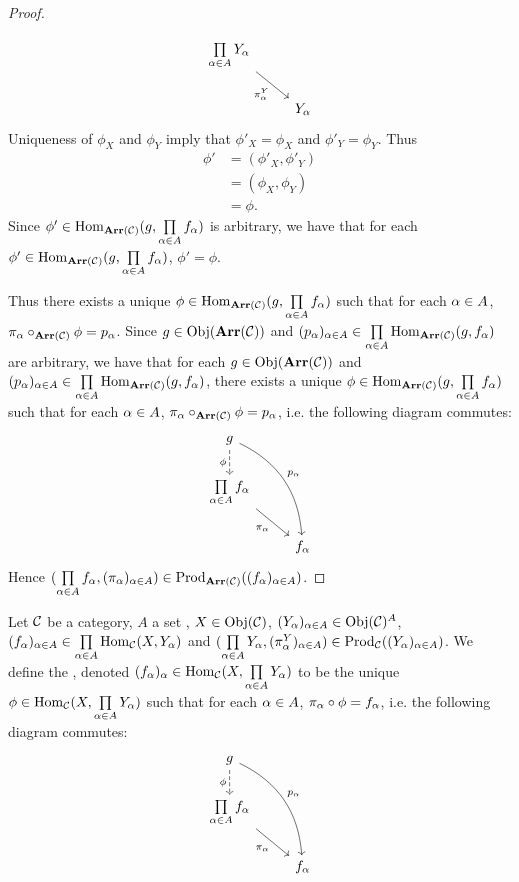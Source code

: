\documentclass{book}
\begin{document}
\begin{proof}
\begin{itemize}
\[\begin{tikzcd}[baseline= 7]
				\prod\limits_{\al \in A} Y_{\al} \arrow[dr, "\pi^Y_{\al}"']                        & \\
				& Y_{\al}   
			\end{tikzcd}
			\]
			Uniqueness of $\phi_X$ and $\phi_Y$ imply that $\phi'_X = \phi_X$ and $\phi'_Y = \phi_Y$. Thus 
			\begin{align*}
				\phi'
				& = (\phi'_X, \phi'_Y) \\
				& = (\phi_X, \phi_Y) \\
				& = \phi.
			\end{align*}
			Since $\phi' \in \operatorname{Hom}_{\operatorname{\textbf{Arr}}(\mathcal{C})}(g, \prod\limits_{\alpha \in A} f_{\alpha})$ is arbitrary, we have that for each $\phi' \in \operatorname{Hom}_{\operatorname{\textbf{Arr}}(\mathcal{C})}(g, \prod\limits_{\alpha \in A} f_{\alpha})$, $\phi' = \phi$. 
		\end{itemize}
		Thus there exists a unique $\phi \in \operatorname{Hom}_{\operatorname{\textbf{Arr}}(\mathcal{C})}(g, \prod\limits_{\alpha \in A} f_{\alpha})$ such that for each $\alpha \in A$, $\pi_{\alpha} \circ_{\operatorname{\textbf{Arr}}(\mathcal{C})} \phi = p_{\alpha}$. Since $g \in \operatorname{Obj}(\operatorname{\textbf{Arr}}(\mathcal{C}))$ and $(p_{\alpha})_{\alpha \in A} \in \prod\limits_{\alpha \in A} \operatorname{Hom}_{\operatorname{\textbf{Arr}}(\mathcal{C})}(g, f_{\alpha})$ are arbitrary, we have that for each $g \in \operatorname{Obj}(\operatorname{\textbf{Arr}}(\mathcal{C}))$ and $(p_{\alpha})_{\alpha \in A} \in \prod\limits_{\alpha \in A} \operatorname{Hom}_{\operatorname{\textbf{Arr}}(\mathcal{C})}(g, f_{\alpha})$, there exists a unique $\phi \in \operatorname{Hom}_{\operatorname{\textbf{Arr}}(\mathcal{C})}(g, \prod\limits_{\alpha \in A} f_{\alpha})$ such that for each $\alpha \in A$, $\pi_{\alpha} \circ_{\operatorname{\textbf{Arr}}(\mathcal{C})} \phi = p_{\alpha}$,
		i.e. the following diagram commutes:
		\[
		\begin{tikzcd}[baseline= 7]
			g   \arrow[d, "\phi"', dashed]  \arrow[ddr, "p_{\al}"', bend left=30, swap]    &  \\
			\prod\limits_{\al \in A} f_{\al} \arrow[dr, "\pi_{\al}"']                        & \\
			& f_{\al}
		\end{tikzcd}
		\]
		Hence $(\prod\limits_{\alpha \in A} f_{\alpha}, (\pi_{\alpha})_{\alpha \in A}) \in \operatorname{Prod}_{\operatorname{\textbf{Arr}}(\mathcal{C})}((f_{\alpha})_{\alpha \in A})$.
	\end{proof}
	
	\begin{defn}
		Let $\mathcal{C}$ be a category, $A$ a set , $X \in \operatorname{Obj}(\mathcal{C})$, $(Y_{\alpha})_{\alpha \in A} \in \operatorname{Obj}(\mathcal{C})^A$, $(f_{\alpha})_{\alpha \in A} \in \prod\limits_{\alpha \in A} \operatorname{Hom}_{\mathcal{C}}(X, Y_{\alpha})$ and $(\prod\limits_{\alpha \in A} Y_{\alpha}, (\pi^Y_{\alpha})_{\alpha \in A}) \in \operatorname{Prod}_{\mathcal{C}}((Y_{\alpha})_{\alpha \in A})$. We define the , denoted $(f_{\alpha})_{\alpha} \in \operatorname{Hom}_{\mathcal{C}}(X, \prod\limits_{\alpha \in A} Y_{\alpha})$ to be the unique $\phi \in \operatorname{Hom}_{\mathcal{C}}(X, \prod\limits_{\alpha \in A} Y_{\alpha})$ such that for each $\alpha \in A$, $\pi_{\alpha} \circ \phi = f_{\alpha}$, i.e. the following diagram commutes:
		\[
		\begin{tikzcd}[baseline= 7]
			g   \arrow[d, "\phi"', dashed]  \arrow[ddr, "p_{\al}"', bend left=30, swap]    &  \\
			\prod\limits_{\al \in A} f_{\al} \arrow[dr, "\pi_{\al}"']                        & \\
			& f_{\al}
		\end{tikzcd}
		\]
	\end{defn}
	
\end{document}
